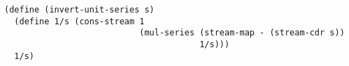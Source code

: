 \documentclass[a4paper,12pt]{article}
\begin{document}
\begin{lstlisting}
(define (invert-unit-series s)
  (define 1/s (cons-stream 1
                           (mul-series (stream-map - (stream-cdr s))
                                       1/s)))
  1/s)
\end{lstlisting}
\end{document}
